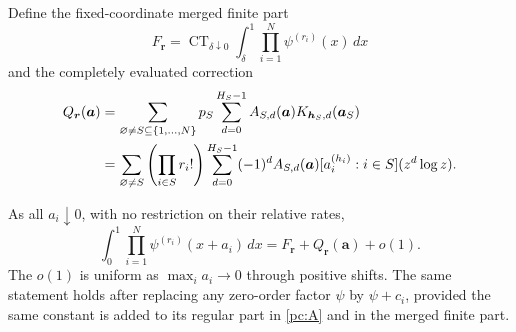 Define the fixed-coordinate merged finite part
\begin{equation}\label{pc:merged}
 F_{\boldsymbol r}
    =\operatorname{CT}_{\delta\downarrow0}
                  \int_\delta^1\prod_{i=1}^N\psi^{(r_i)}(x)\,dx
\end{equation}
and the completely evaluated correction
\begin{align}\label{pc:Q}
 Q_{\boldsymbol r}(\boldsymbol a)
   &=\sum_{\varnothing\ne S\subseteq\{1,\ldots,N\}}
        p_S\sum_{d=0}^{H_S-1}A_{S,d}(\boldsymbol a)
                        K_{\boldsymbol h_S,d}(\boldsymbol a_S)\notag\\
   &=\sum_{\varnothing\ne S}
       \left(\prod_{i\in S}r_i!\right)
       \sum_{d=0}^{H_S-1}(-1)^d A_{S,d}(\boldsymbol a)
        [a_i^{(h_i)}:i\in S](z^d\log z).
\end{align}

\begin{theorem}
\label{pc:uniform}
As all $a_i\downarrow0$, with no restriction on their relative rates,
\begin{equation}\label{pc:uniform-formula}
 \boxed{\displaystyle
 \int_0^1\prod_{i=1}^N\psi^{(r_i)}(x+a_i)\,dx
          =F_{\boldsymbol r}+Q_{\boldsymbol r}(\boldsymbol a)+o(1).}
\end{equation}
The $o(1)$ is uniform as $\max_i a_i\to0$ through positive shifts.
The same statement holds after replacing any zero-order factor
$\psi$ by $\psi+c_i$, provided the same constant is added to its
regular part in \eqref{pc:A} and in the merged finite part.
\end{theorem}

